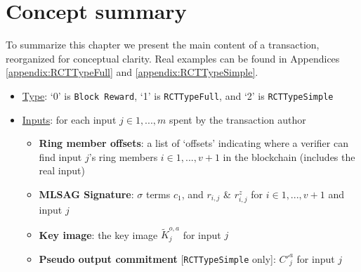 \newpage
\section{Concept summary}
\label{sec:transaction_summary}

To summarize this chapter we present the main content of a transaction, reorganized for conceptual clarity. Real examples can be found in Appendices \ref{appendix:RCTTypeFull} and \ref{appendix:RCTTypeSimple}.

\begin{itemize}
    \item \underline{Type}: `0' is {\tt Block Reward}, `1' is {\tt RCTTypeFull}, and `2' is {\tt RCTTypeSimple} %
    \item \underline{Inputs}: for each input $j \in 1,...,m$ spent by the transaction author
    \begin{itemize}
        \item \textbf{Ring member offsets}: a list of `offsets' indicating where a verifier can find input $j$'s ring members $i \in 1,...,v+1$ in the blockchain (includes the real input)
        \item \textbf{MLSAG Signature}: $\sigma$ terms $c_1$, and $r_{i,j}$ \& $r^{z}_{i,j}$ for $i \in 1,...,v+1$ and input $j$
        \item \textbf{Key image}: the key image $\tilde{K}^{o,a}_j$ for input $j$
        \item \textbf{Pseudo output commitment} {[{\tt RCTTypeSimple} only]}: $C'^{a}_j$ for input $j$
    \end{itemize}
    

\end{itemize}
